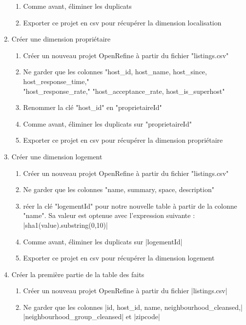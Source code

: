 \documentclass[11pt, a4paper]{article}
\begin{document}
\begin{enumerate}
\begin{enumerate}[label=\roman*.]
      \item Comme avant, éliminer les duplicats
      \item Exporter ce projet en csv pour récupérer la dimension localisation
   \end{enumerate}
   \item Créer une dimension propriétaire
   \begin{enumerate}[label=\roman*.]
      \item Créer un nouveau projet OpenRefine à partir du fichier \spverb"listings.csv"
      \item Ne garder que les colonnes \spverb"host_id, host_name, host_since, host_response_time,"\\ \spverb"host_response_rate," \spverb"host_acceptance_rate, host_is_superhost"
      \item Renommer la clé \spverb"host_id" en \spverb"proprietaireId"
      \item Comme avant, éliminer les duplicats sur \spverb"proprietaireId"
      \item Exporter ce projet en csv pour récupérer la dimension propriétaire
   \end{enumerate}
   \item Créer une dimension logement
   \begin{enumerate}[label=\roman*.]
      \item Créer un nouveau projet OpenRefine à partir du fichier \spverb"listings.csv"
      \item Ne garder que les colonnes \spverb"name, summary, space, description"
      \item réer la clé \spverb"logementId" pour notre nouvelle table à partir de la colonne \spverb"name". Sa valeur est optenue avec l'expression suivante : \spverb|sha1(value).substring(0,10)|
      \item Comme avant, éliminer les duplicats sur \spverb|logementId|
      \item Exporter ce projet en csv pour récupérer la dimension logement
   \end{enumerate}
   \item Créer la première partie de la table des faits
   \begin{enumerate}[label=\roman*.]
      \item Créer un nouveau projet OpenRefine à partir du fichier \spverb|listings.csv|
      \item Ne garder que les colonnes \spverb|id, host_id, name, neighbourhood_cleansed,|\\ \spverb|neighbourhood_group_cleansed| et \spverb|zipcode|

\end{enumerate}
\end{enumerate}
\end{document}
